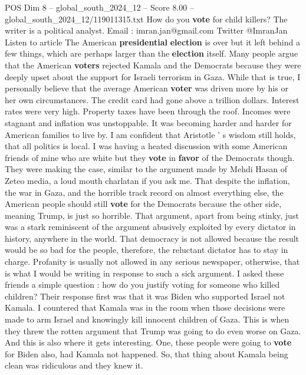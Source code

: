 \begin{textsample}{POS Dim 8 – global\_south\_2024\_12 – Score 8.00 – global\_south\_2024\_12/119011315.txt}  \label{ex:f8_pos_349}
How do you \textbf{vote} for child killers?
The writer is a political analyst.
Email : imran.jan@gmail.com Twitter @ImranJan Listen to article The American \textbf{presidential} \textbf{election} is over but it left behind a few things, which are perhaps larger than the \textbf{election} itself.
Many people argue that the American \textbf{voters} rejected Kamala and the Democrats because they were deeply upset about the support for Israeli terrorism in Gaza.
While that is true, I personally believe that the average American \textbf{voter} was driven more by his or her own circumstances.
The credit card had gone above a trillion dollars.
Interest rates were very high.
Property taxes have been through the roof.
Incomes were stagnant and inflation was unstoppable.
It was becoming harder and harder for American families to live by.
I am confident that Aristotle ' s wisdom still holds, that all politics is local.
I was having a heated discussion with some American friends of mine who are white but they \textbf{vote} in \textbf{favor} of the Democrats though.
They were making the case, similar to the argument made by Mehdi Hasan of Zeteo media, a loud mouth charlatan if you ask me.
That despite the inflation, the war in Gaza, and the horrible track record on almost everything else, the American people should still \textbf{vote} for the Democrats because the other side, meaning Trump, is just so horrible.
That argument, apart from being stinky, just was a stark reminiscent of the argument abusively exploited by every dictator in history, anywhere in the world.
That democracy is not allowed because the result would be so bad for the people, therefore, the reluctant dictator has to stay in charge.
Profanity is usually not allowed in any serious newspaper, otherwise, that is what I would be writing in response to such a sick argument.
I asked these friends a simple question : how do you justify voting for someone who killed children?
Their response first was that it was Biden who supported Israel not Kamala.
I countered that Kamala was in the room when those decisions were made to arm Israel and knowingly kill innocent children of Gaza.
This is when they threw the rotten argument that Trump was going to do even worse on Gaza.
And this is also where it gets interesting.
One, these people were going to \textbf{vote} for Biden also, had Kamala not happened.
So, that thing about Kamala being clean was ridiculous and they knew it.

\end{textsample}
